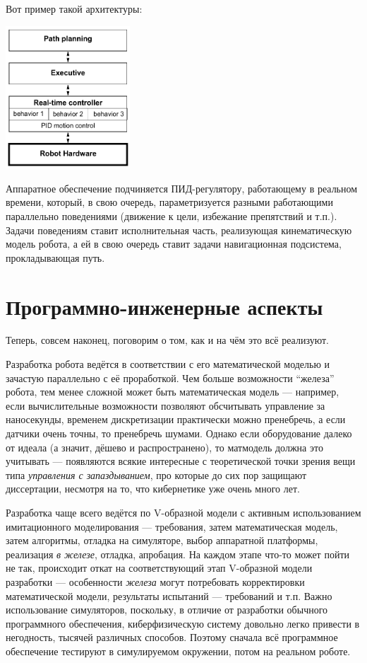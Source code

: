 \documentclass{../../text-style}
\begin{document}
Вот пример такой архитектуры:

\begin{center}
    \includegraphics[width=0.35\textwidth]{navigationTiers.png}
\end{center}

Аппаратное обеспечение подчиняется ПИД-регулятору, работающему в реальном времени, который, в свою очередь, параметризуется разными работающими параллельно поведениями (движение к цели, избежание препятствий и т.п.).
Задачи поведениям ставит исполнительная часть, реализующая кинематическую модель робота, а ей в свою очередь ставит задачи навигационная подсистема, прокладывающая путь.

\section{Программно-инженерные аспекты}

Теперь, совсем наконец, поговорим о том, как и на чём это всё реализуют.

Разработка робота ведётся в соответствии с его математической моделью и зачастую параллельно с её проработкой.
Чем больше возможности \enquote{железа} робота, тем менее сложной может быть математическая модель --- например, если вычислительные возможности позволяют обсчитывать управление за наносекунды, временем дискретизации практически можно пренебречь, а если датчики очень точны, то пренебречь шумами.
Однако если оборудование далеко от идеала (а значит, дёшево и распространено), то матмодель должна это учитывать --- появляются всякие интересные с теоретической точки зрения вещи типа \emph{управления с запаздыванием}, про которые до сих пор защищают диссертации, несмотря на то, что кибернетике уже очень много лет.

Разработка чаще всего ведётся по V-образной модели с активным использованием имитационного моделирования --- требования, затем математическая модель, затем алгоритмы, отладка на симуляторе, выбор аппаратной платформы, реализация \emph{в железе}, отладка, апробация.
На каждом этапе что-то может пойти не так, происходит откат на соответствующий этап V-образной модели разработки --- особенности \emph{железа} могут потребовать корректировки математической модели, результаты испытаний --- требований и т.п.
Важно использование симуляторов, поскольку, в отличие от разработки обычного программного обеспечения, киберфизическую систему довольно легко привести в негодность, тысячей различных способов.
Поэтому сначала всё программное обеспечение тестируют в симулируемом окружении, потом на реальном роботе.
\end{document}
